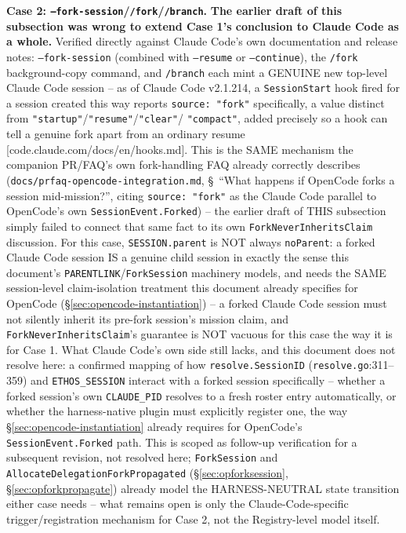 \documentclass[a4paper,10pt,fleqn]{article}
\newcommand{\fpath}[1]{\texttt{#1}}
\newcommand{\field}[1]{\texttt{#1}}
\begin{document}
\textbf{Case 2: \field{--fork-session}/\field{/fork}/\field{/branch}.}
\textbf{The earlier draft of this subsection was wrong to extend
Case 1's conclusion to Claude Code as a whole.} Verified directly
against Claude Code's own documentation and release notes:
\field{--fork-session} (combined with \field{--resume} or
\field{--continue}), the \field{/fork} background-copy command, and
\field{/branch} each mint a GENUINE new top-level Claude Code session
-- as of Claude Code v2.1.214, a \field{SessionStart} hook fired for a
session created this way reports \field{source: "fork"} specifically,
a value distinct from \field{"startup"}/\field{"resume"}/\field{"clear"}/
\field{"compact"}, added precisely so a hook can tell a genuine fork
apart from an ordinary resume [code.claude.com/docs/en/hooks.md]. This
is the SAME mechanism the companion PR/FAQ's own fork-handling FAQ
already correctly describes (\fpath{docs/prfaq-opencode-integration.md},
\S~``What happens if OpenCode forks a session mid-mission?'', citing
\field{source: "fork"} as the Claude Code parallel to OpenCode's own
\field{SessionEvent.Forked}) -- the earlier draft of THIS subsection
simply failed to connect that same fact to its own
\field{ForkNeverInheritsClaim} discussion. For this case, \field{SESSION.parent}
is NOT always \field{noParent}: a forked Claude Code session IS a
genuine child session in exactly the sense this document's
\field{PARENTLINK}/\field{ForkSession} machinery models, and needs the
SAME session-level claim-isolation treatment this document already
specifies for OpenCode (\S\ref{sec:opencode-instantiation}) -- a forked
Claude Code session must not silently inherit its pre-fork session's
mission claim, and \field{ForkNeverInheritsClaim}'s guarantee is NOT
vacuous for this case the way it is for Case 1. What Claude Code's own
side still lacks, and this document does not resolve here: a confirmed
mapping of how \field{resolve.SessionID} (\fpath{resolve.go}:311--359)
and \field{ETHOS\_SESSION} interact with a forked session specifically
-- whether a forked session's own \field{CLAUDE\_PID} resolves to a
fresh roster entry automatically, or whether the harness-native plugin
must explicitly register one, the way \S\ref{sec:opencode-instantiation}
already requires for OpenCode's \field{SessionEvent.Forked} path. This
is scoped as follow-up verification for a subsequent revision, not
resolved here; \field{ForkSession} and
\field{AllocateDelegationForkPropagated}
(\S\ref{sec:opforksession}, \S\ref{sec:opforkpropagate}) already model
the HARNESS-NEUTRAL state transition either case needs -- what remains
open is only the Claude-Code-specific trigger/registration mechanism
for Case 2, not the Registry-level model itself.
\end{document}
